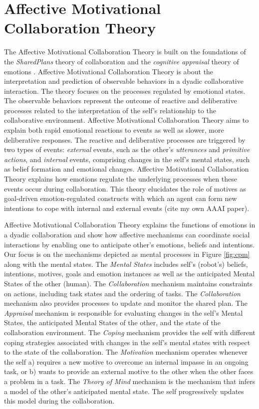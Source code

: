 \documentclass[letterpaper]{article}
\begin{document}
\section{Affective Motivational Collaboration Theory}
The Affective Motivational Collaboration Theory is built on the foundations of
the \textit{SharedPlans} theory of collaboration \cite{grosz:plans-discourse}
and the \textit{cognitive appraisal} theory of emotions
\cite{gratch:domain-independent}. Affective Motivational Collaboration Theory is
about the interpretation and prediction of observable behaviors in a dyadic
collaborative interaction. The theory focuses on the processes regulated by
emotional states. The observable behaviors represent the outcome of reactive and
deliberative processes related to the interpretation of the self's relationship
to the collaborative environment. Affective Motivational Collaboration Theory
aims to explain both rapid emotional reactions to events as well as slower, more
deliberative responses. The reactive and deliberative processes are triggered by
two types of events: \textit{external} events, such as the other's
\textit{utterances} and \textit{primitive actions}, and \textit{internal}
events, comprising changes in the self's mental states, such as belief formation
and emotional changes. Affective Motivational Collaboration Theory explains how
emotions regulate the underlying processes when these events occur during
collaboration. This theory elucidates the role of motives as goal-driven
emotion-regulated constructs with which an agent can form new intentions to cope
with internal and external events (cite my own AAAI paper).

Affective Motivational Collaboration Theory explains the functions of emotions
in a dyadic collaboration and show how affective mechanisms can coordinate
social interactions by enabling one to anticipate other's emotions, beliefs and
intentions. Our focus is on the mechanisms depicted as mental processes in
Figure \ref{fig:cpm} along with the mental states. The \textit{Mental States}
includes self's (robot's) beliefs, intentions, motives, goals and emotion
instances as well as the anticipated Mental States of the other (human). The
\textit{Collaboration} mechanism maintains constraints on actions, including
task states and the ordering of tasks. The \textit{Collaboration} mechanism also
provides processes to update and monitor the shared plan. The \textit{Appraisal}
mechanism is responsible for evaluating changes in the self's Mental States, the
anticipated Mental States of the other, and the state of the collaboration
environment. The \textit{Coping} mechanism provides the self with different
coping strategies associated with changes in the self's mental states with
respect to the state of the collaboration. The \textit{Motivation} mechanism
operates whenever the self a) requires a new motive to overcome an internal
impasse in an ongoing task, or b) wants to provide an external motive to the
other when the other faces a problem in a task. The \textit{Theory of Mind}
mechanism is the mechanism that infers a model of the other's anticipated mental
state. The self progressively updates this model during the collaboration.
\end{document}
